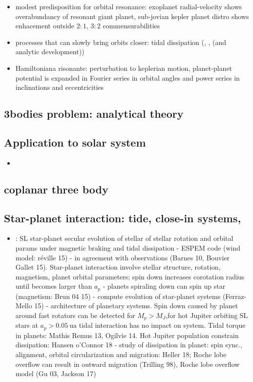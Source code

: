 \documentclass[main.tex]{subfiles}
\begin{document}
\begin{itemize}
\item modest predisposition for orbital resonance: exoplanet radial-velocity shows overabundancy of resonant giant planet, sub-jovian kepler planet distro shows enhacement outside $2:1$, $3:2$ commensurabilities
\item processes that can slowly bring orbits closer: tidal dissipation (\cite{goldreich1966q}, \cite{yoder1981tides}, \cite{peale1976orbital} (and analytic development))    
\item Hamiltoniana risonante: perturbation to keplerian motion, planet-planet potential is expanded in Fourier series in orbital angles and power series in inclinations and eccentricities
\end{itemize}

\subsection{3bodies problem: analytical theory}

\subsection{Application to solar system}
\begin{itemize}
    \item 
\end{itemize}
\subsection{coplanar three body}

\subsection{Star-planet interaction: tide, close-in systems, }

\begin{itemize}
    \item \cite{benbakoura2019evolution}: SL star-planet secular evolution of stellar of stellar rotation and orbital params under magnetic braking and tidal dissipation - ESPEM code (wind model: r\'eville 15) - in agreement with observations (Barnes 10, Bouvier Gallet 15). Star-planet interaction involve stellar structure, rotation, magnetism, planet orbital parameters; spin down increases corotation radius until becomes larger than $a_p$ - planets spiraling down can spin up star (magnetism: Brun 04 15) - compute evolution of star-planet systems (Ferraz-Mello 15) - architecture of planetary systems. Spin down caused by planet around fast rotators can be detected for $M_p>M_J$,for hot Jupiter orbiting SL stars at $a_p>\SI{0.05}{\astronomicalunit}$ tidal interaction has no impact on system. Tidal torque in planets: Mathis Remus 13, Ogilvie 14. Hot Jupiter population constrain dissipation: Hansen o'Connor 18 - study of dissipation in planet: spin sync., alignment, orbital circularization and migration: Heller 18; Roche lobe overflow can result in outward migration (Trilling 98), Roche lobe overflow model (Gu 03, Jackson 17)
\end{itemize}
\end{document}

